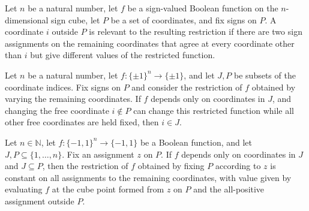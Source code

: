 \begin{definition}
\label{FABL.IsRelevantJuntaRestriction}
\leanok
{}
Let $n$ be a natural number, let $f$ be a sign-valued Boolean function on the
$n$-dimensional sign cube, let $P$ be a set of coordinates, and fix signs on $P$. A
coordinate $i$ outside $P$ is relevant to the resulting restriction if there are two
sign assignments on the remaining coordinates that agree at every coordinate other than
$i$ but give different values of the restricted function.
\end{definition}

\begin{theorem}
\label{FABL.mem_of_isRelevantJuntaRestriction_of_dependsOn}
\leanok
{}
Let $n$ be a natural number, let $f:\{\pm1\}^n\to\{\pm1\}$, and let $J,P$ be subsets of
the coordinate indices. Fix signs on $P$ and consider the restriction of $f$ obtained by
varying the remaining coordinates. If $f$ depends only on coordinates in $J$, and
changing the free coordinate $i\notin P$ can change this restricted function while all
other free coordinates are held fixed, then $i\in J$.
\end{theorem}

\begin{theorem}
\label{FABL.juntaRestriction_eq_const_of_dependsOn_of_subset}
\leanok
{}
Let $n\in\mathbb{N}$, let $f:\{−1,1\}^n\to\{−1,1\}$ be a Boolean function, and let
$J,P\subseteq\{1,\ldots,n\}$. Fix an assignment $z$ on $P$. If $f$ depends only on
coordinates in $J$ and $J\subseteq P$, then the restriction of $f$ obtained by fixing
$P$ according to $z$ is constant on all assignments to the remaining coordinates, with
value given by evaluating $f$ at the cube point formed from $z$ on $P$ and the
all-positive assignment outside $P$.
\end{theorem}

